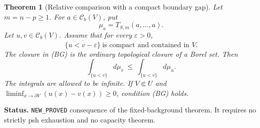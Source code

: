 \documentclass[11pt,a4paper]{article}
\numberwithin{equation}{section}
\newtheorem{theorem}{Theorem}[section]
\theoremstyle{definition}
\theoremstyle{remark}
\begin{document}
\begin{theorem}[Relative comparison with a compact boundary gap]
\label{thm:relative-comparison}
Let \(m=n-p\geq1\). For \(a\in\mathcal C_b(V)\), put
\[
 \mu_a=T_{S,m}(a,\ldots,a).
\]
Let \(u,v\in\mathcal C_b(V)\). Assume that for every \(\varepsilon>0\),
\[
 \overline{\{u<v-\varepsilon\}}\ \text{is compact and contained in }V.
\tag{BG}
\]
The closure in (BG) is the ordinary topological closure of a Borel set. Then
\[
 \int_{\{u<v\}}d\mu_v\ \leq\ \int_{\{u<v\}}d\mu_u.
\tag{CP}
\]
The integrals are allowed to be infinite. If \(V\Subset U\) and
\(\liminf_{x\to\partial V}(u(x)-v(x))\geq0\), condition (BG) holds.
\end{theorem}

\noindent\textbf{Status.} \texttt{NEW\_PROVED} consequence of the
fixed-background theorem. It requires no strictly psh exhaustion and no
capacity theorem.
\end{document}
